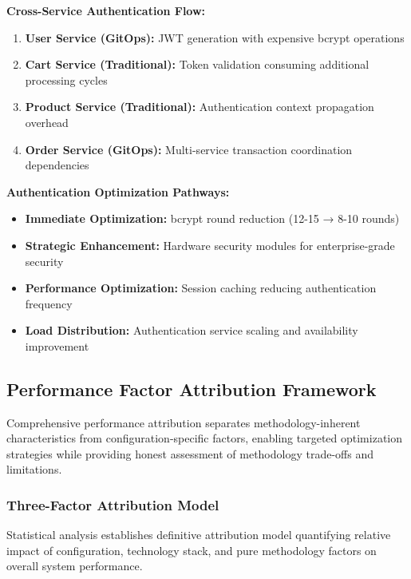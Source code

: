 \textbf{Cross-Service Authentication Flow:}
\begin{enumerate}
\item \textbf{User Service (GitOps):} JWT generation with expensive bcrypt operations
\item \textbf{Cart Service (Traditional):} Token validation consuming additional processing cycles
\item \textbf{Product Service (Traditional):} Authentication context propagation overhead
\item \textbf{Order Service (GitOps):} Multi-service transaction coordination dependencies
\end{enumerate}

\textbf{Authentication Optimization Pathways:}
\begin{itemize}
\item \textbf{Immediate Optimization:} bcrypt round reduction (12-15 → 8-10 rounds)
\item \textbf{Strategic Enhancement:} Hardware security modules for enterprise-grade security
\item \textbf{Performance Optimization:} Session caching reducing authentication frequency
\item \textbf{Load Distribution:} Authentication service scaling and availability improvement
\end{itemize}

\subsection{Performance Factor Attribution Framework}
\label{subsec:performance_factors}

Comprehensive performance attribution separates methodology-inherent characteristics from configuration-specific factors, enabling targeted optimization strategies while providing honest assessment of methodology trade-offs and limitations.

\subsubsection{Three-Factor Attribution Model}

Statistical analysis establishes definitive attribution model quantifying relative impact of configuration, technology stack, and pure methodology factors on overall system performance.

